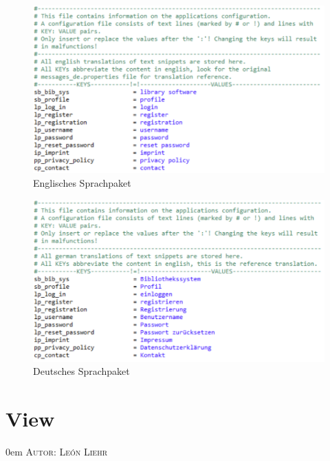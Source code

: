 \documentclass{article}
\makeatletter
\newcommand{\sectionauthor}[1]{
	{\parindent 0em \large \scshape Autor: #1 \par \nobreak \vspace*{1em}}
	\@afterheading
}
\makeatother
\begin{document}
\begin{figure}[H]
\hypertarget{messagesen}{}
\centering
\includegraphics[width=50em]{messagesen}
\caption{Englisches Sprachpaket}
\end{figure}

\begin{figure}[H]
\hypertarget{messagesde}{}
\centering
\includegraphics[width=50em]{messagesde}
\caption{Deutsches Sprachpaket}
\end{figure}



\section{View}
\sectionauthor{León Liehr}

\newcommand{\M}[1]{\texttt{#1}} %
\newcommand{\tag}[2]{\M{#1:#2}} %
\newcommand{\B}[1]{\M{\RB{#1}}} %
\newcommand{\RB}[1]{\#\{#1\}} %
\newcommand{\2}[1]{\multirow{2}{*}{#1}}
\newcommand{\3}[1]{\multirow{3}{*}{#1}}
\newcommand{\4}[1]{\multirow{4}{*}{#1}}
\newcommand{\disambiguationrule}{\arrayrulecolor{lightgray}\cmidrule(r){3-4}\arrayrulecolor{black}}
\newcommand{\INDENT}{\hspace{0.3cm}}
\end{document}

